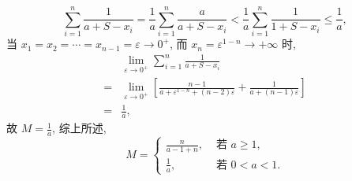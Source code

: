 $$
\sum_{i=1}^n \frac{1}{a+S-x_i}=\frac{1}{a} \sum_{i=1}^n \frac{a}{a+S-x_i}<\frac{1}{a} \sum_{i=1}^n \frac{1}{1+S-x_i} \leqslant \frac{1}{a},
$$
当 $x_1=x_2=\cdots=x_{n-1}=\varepsilon \rightarrow 0^{+}$, 而 $x_n=\varepsilon^{1-n} \rightarrow+\infty$ 时,
$$
\begin{aligned}
& \lim _{\varepsilon \rightarrow 0^{+}} \sum_{i=1}^n \frac{1}{a+S-x_i} \\
= & \lim _{\varepsilon \rightarrow 0^{+}}\left[\frac{n-1}{a+\varepsilon^{1-n}+(n-2) \varepsilon}+\frac{1}{a+(n-1) \varepsilon}\right] \\
= & \frac{1}{a},
\end{aligned}
$$
故 $M=\frac{1}{a}$, 综上所述,
$$
M= \begin{cases}\frac{n}{a-1+n}, & \text { 若 } a \geqslant 1, \\ \frac{1}{a}, & \text { 若 } 0<a<1 .\end{cases}
$$


